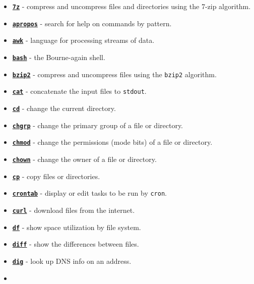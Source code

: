 \documentclass[10pt,]{book}
\numberwithin{figure}{chapter}
\begin{document}
\begin{itemize}
\item
  \href{http://linux.die.net/man/1/7z}{\textbf{\texttt{7z}}} - compress
  and uncompress files and directories using the 7-zip algorithm.
\item
  \href{http://linux.die.net/man/1/apropos}{\textbf{\texttt{apropos}}} -
  search for help on commands by pattern.
\item
  \href{http://linux.die.net/man/1/awk}{\textbf{\texttt{awk}}} -
  language for processing streams of data.
\item
  \href{http://linux.die.net/man/1/bash}{\textbf{\texttt{bash}}} - the
  Bourne-again shell.
\item
  \href{http://linux.die.net/man/1/bzip2}{\textbf{\texttt{bzip2}}} -
  compress and uncompress files using the \texttt{bzip2} algorithm.
\item
  \href{http://linux.die.net/man/1/cat}{\textbf{\texttt{cat}}} -
  concatenate the input files to \texttt{stdout}.
\item
  \href{http://linux.die.net/man/1/cd}{\textbf{\texttt{cd}}} - change
  the current directory.
\item
  \href{http://linux.die.net/man/1/chgrp}{\textbf{\texttt{chgrp}}} -
  change the primary group of a file or directory.
\item
  \href{http://linux.die.net/man/1/chmod}{\textbf{\texttt{chmod}}} -
  change the permissions (mode bits) of a file or directory.
\item
  \href{http://linux.die.net/man/1/chown}{\textbf{\texttt{chown}}} -
  change the owner of a file or directory.
\item
  \href{http://linux.die.net/man/1/cp}{\textbf{\texttt{cp}}} - copy
  files or directories.
\item
  \href{http://linux.die.net/man/1/crontab}{\textbf{\texttt{crontab}}} -
  display or edit tasks to be run by \texttt{cron}.
\item
  \href{http://linux.die.net/man/1/curl}{\textbf{\texttt{curl}}} -
  download files from the internet.
\item
  \href{http://linux.die.net/man/1/df}{\textbf{\texttt{df}}} - show
  space utilization by file system.
\item
  \href{http://linux.die.net/man/1/diff}{\textbf{\texttt{diff}}} - show
  the differences between files.
\item
  \href{http://linux.die.net/man/1/dig}{\textbf{\texttt{dig}}} - look up
  DNS info on an address.
\item

\end{itemize}
\end{document}
